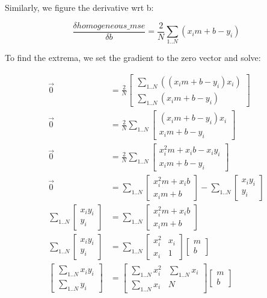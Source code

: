 \documentclass{article}
\begin{document}
Similarly, we figure the derivative wrt b:

$$
\frac{\delta homogeneous\_mse}{\delta b} = \frac{2}{N} \sum_{1..N} (x_i m + b - y_i)
$$

To find the extrema, we set the gradient to the zero vector and solve:

\begin{align*}
\overrightarrow{0} &= \frac{2}{N} \begin{bmatrix}
\sum_{1..N} ((x_i m + b - y_i)x_i)\\
\sum_{1..N} (x_i m + b - y_i)
\end{bmatrix} \\
\overrightarrow{0} &= \frac{2}{N} \sum_{1..N} \begin{bmatrix}
(x_i m + b - y_i)x_i \\
x_i m + b - y_i
\end{bmatrix} \\
\overrightarrow{0} &= \frac{2}{N} \sum_{1..N} \begin{bmatrix}
x_i^2 m + x_i b - x_i y_i \\
x_i m + b - y_i
\end{bmatrix} \\
\overrightarrow{0} &= \sum_{1..N} \begin{bmatrix}
x_i^2 m + x_i b \\
x_i m + b
\end{bmatrix} - \sum_{1..N} \begin{bmatrix}
x_i y_i \\
y_i
\end{bmatrix} \\
\sum_{1..N} \begin{bmatrix}
x_i y_i \\
y_i
\end{bmatrix} &= \sum_{1..N} \begin{bmatrix}
x_i^2 m + x_i b \\
x_i m + b
\end{bmatrix} \\
\sum_{1..N} \begin{bmatrix}
x_i y_i \\
y_i
\end{bmatrix} &= \sum_{1..N} \begin{bmatrix}
x_i^2 & x_i \\
x_i   & 1
\end{bmatrix} \begin{bmatrix}
m \\
b
\end{bmatrix} \\
\begin{bmatrix}
\sum_{1..N} x_i y_i \\
\sum_{1..N} y_i
\end{bmatrix} &= \begin{bmatrix}
\sum_{1..N} x_i^2 & \sum_{1..N} x_i \\
\sum_{1..N} x_i   & N
\end{bmatrix} \begin{bmatrix}
m \\
b
\end{bmatrix}
\end{align*}
\end{document}
